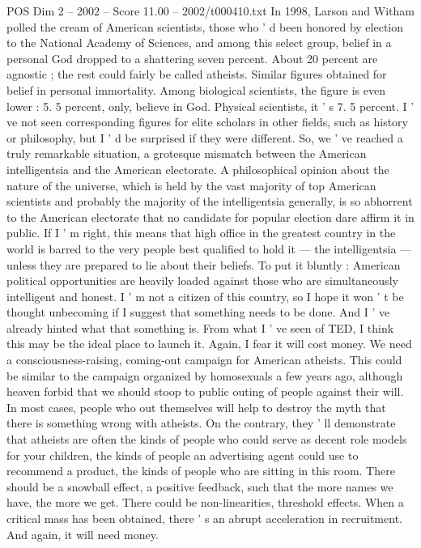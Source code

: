 \begin{textsample}{POS Dim 2 – 2002 – Score 11.00 – 2002/t000410.txt}
In 1998, Larson and Witham polled the cream of American scientists, those who ' d been honored by election to the National Academy of Sciences, and among this select group, belief in a personal God dropped to a shattering seven percent.
About 20 percent are agnostic ; the rest could fairly be called atheists.
Similar figures obtained for belief in personal immortality.
Among biological scientists, the figure is even lower : 5. 5 percent, only, believe in God.
Physical scientists, it ' s 7. 5 percent.
I ' ve not seen corresponding figures for elite scholars in other fields, such as history or philosophy, but I ' d be surprised if they were different.
So, we ' ve reached a truly remarkable situation, a grotesque mismatch between the American intelligentsia and the American electorate.
A philosophical opinion about the nature of the universe, which is held by the vast majority of top American scientists and probably the majority of the intelligentsia generally, is so abhorrent to the American electorate that no candidate for popular election dare affirm it in public.
If I ' m right, this means that high office in the greatest country in the world is barred to the very people best qualified to hold it — the intelligentsia — unless they are prepared to lie about their beliefs.
To put it bluntly : American political opportunities are heavily loaded against those who are simultaneously intelligent and honest.
I ' m not a citizen of this country, so I hope it won ' t be thought unbecoming if I suggest that something needs to be done.
And I ' ve already hinted what that something is.
From what I ' ve seen of TED, I think this may be the ideal place to launch it.
Again, I fear it will cost money.
We need a consciousness-raising, coming-out campaign for American atheists.
This could be similar to the campaign organized by homosexuals a few years ago, although heaven forbid that we should stoop to public outing of people against their will.
In most cases, people who out themselves will help to destroy the myth that there is something wrong with atheists.
On the contrary, they ' ll demonstrate that atheists are often the kinds of people who could serve as decent role models for your children, the kinds of people an advertising agent could use to recommend a product, the kinds of people who are sitting in this room.
There should be a snowball effect, a positive feedback, such that the more names we have, the more we get.
There could be non-linearities, threshold effects.
When a critical mass has been obtained, there ' s an abrupt acceleration in recruitment.
And again, it will need money.

\end{textsample}
